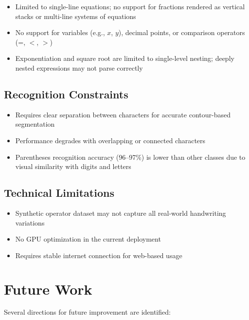 \documentclass[conference]{IEEEtran}
\begin{document}
\begin{itemize}
    \item Limited to single-line equations; no support for fractions rendered as vertical stacks or multi-line systems of equations
    \item No support for variables (e.g., $x$, $y$), decimal points, or comparison operators (=, $<$, $>$)
    \item Exponentiation and square root are limited to single-level nesting; deeply nested expressions may not parse correctly
\end{itemize}

\subsection{Recognition Constraints}

\begin{itemize}
    \item Requires clear separation between characters for accurate contour-based segmentation
    \item Performance degrades with overlapping or connected characters
    \item Parentheses recognition accuracy (96--97\%) is lower than other classes due to visual similarity with digits and letters
\end{itemize}

\subsection{Technical Limitations}

\begin{itemize}
    \item Synthetic operator dataset may not capture all real-world handwriting variations
    \item No GPU optimization in the current deployment
    \item Requires stable internet connection for web-based usage
\end{itemize}

\section{Future Work}

Several directions for future improvement are identified:
\end{document}
